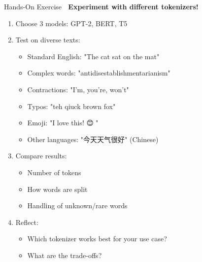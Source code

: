 \documentclass[aspectratio=169]{beamer}
\begin{document}
\begin{frame}[shrink=10]{Hands-On Exercise 🧪}
    \textbf{Experiment with different tokenizers!}

    \begin{enumerate}\setlength{\itemsep}{0pt}
        \item Choose 3 models: GPT-2, BERT, T5
        \item Test on diverse texts:
        \begin{itemize}\setlength{\itemsep}{0pt}
            \item Standard English: "The cat sat on the mat"
            \item Complex words: "antidisestablishmentarianism"
            \item Contractions: "I'm, you're, won't"
            \item Typos: "teh qiuck brown fox"
            \item Emoji: "I love this! 😊🎉"
            \item Other languages: "今天天气很好" (Chinese)
        \end{itemize}
        \item Compare results:
        \begin{itemize}\setlength{\itemsep}{0pt}
            \item Number of tokens
            \item How words are split
            \item Handling of unknown/rare words
        \end{itemize}
        \item Reflect:
        \begin{itemize}\setlength{\itemsep}{0pt}
            \item Which tokenizer works best for your use case?
            \item What are the trade-offs?
        \end{itemize}
    \end{enumerate}
\end{frame}
\end{document}
